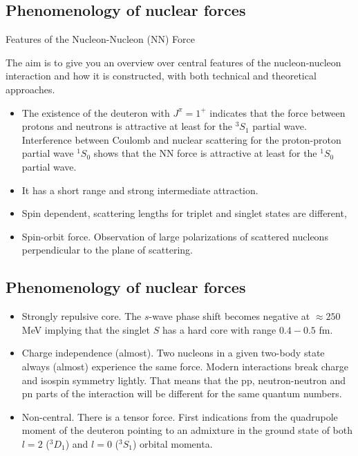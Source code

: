 \documentclass[%
twoside,                 %
final,                   %
10pt]{article}
\begin{document}
\subsection{Phenomenology of nuclear forces}
\begin{block}{Features of the Nucleon-Nucleon (NN) Force }

The aim is to give you an overview over central features of the nucleon-nucleon interaction and how it is constructed, with both technical and theoretical approaches. 

\begin{itemize}
\item The existence of the deuteron with $J^{\pi}=1^+$ indicates that the force between protons and neutrons is attractive at least for the $^3S_1$ partial wave. Interference between Coulomb and nuclear scattering for the proton-proton partial wave $^1S_0$ shows that  the NN force is attractive at least for the $^1S_0$ partial wave. 

\item It has a short range and strong intermediate attraction.

\item Spin dependent, scattering lengths for triplet and singlet states are different,

\item Spin-orbit force. Observation of large polarizations of scattered nucleons perpendicular to the plane of scattering.
\end{itemize}

\noindent
\end{block}

\subsection{Phenomenology of nuclear forces}
\begin{block}{}

\begin{itemize}
\item Strongly repulsive core. The $s$-wave phase shift becomes negative at $\approx 250$ MeV implying that the singlet $S$ has a hard core with range $0.4-0.5$ fm. 

\item Charge independence (almost). Two nucleons in a given two-body state always (almost) experience the same force. Modern interactions break charge and isospin symmetry lightly. That means that the pp, neutron-neutron and pn parts of the interaction will be different for the same quantum numbers. 

\item Non-central. There is a tensor force. First indications from the quadrupole moment of the deuteron pointing to an admixture in the ground state of both $l=2$ ($^3D_1$) and $l=0$ ($^3S_1$) orbital momenta.
\end{itemize}

\noindent
\end{block}
\end{document}
